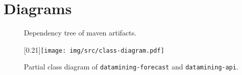 \chapter{Diagrams}
\begin{figure}[H]
    \begin{center}
        \caption{Dependency tree of maven artifacts.}
        \label{appen:maven-deps}
    \end{center}
\end{figure}

\begin{figure}[H]
    \begin{center}
        \scalebox{0.35}[0.21]{\texttt{[image: img/src/class-diagram.pdf]}}
        \caption{Partial class diagram of \texttt{datamining-forecast} and \texttt{datamining-api}.}
        \label{appen:class-diagram}
    \end{center}
\end{figure}

